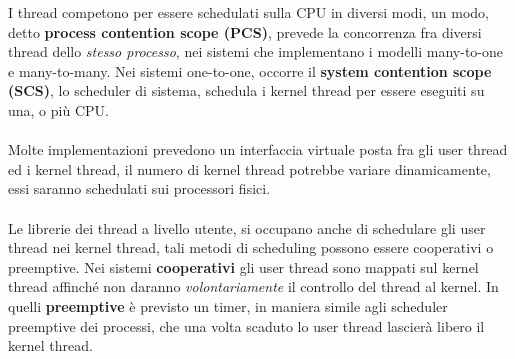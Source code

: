 \documentclass[12pt, letterpaper]{article}
\newcommand{\acc}{\\\hphantom{}\\}
\begin{document}
I thread competono per essere schedulati sulla CPU in diversi modi, un modo, detto \textbf{process contention scope (PCS)}, 
prevede la concorrenza fra diversi thread dello \textit{stesso processo}, nei sistemi che implementano i modelli 
many-to-one e many-to-many. Nei sistemi one-to-one, occorre il \textbf{system contention scope (SCS)}, lo scheduler di sistema, 
schedula i kernel thread per essere eseguiti su una, o più CPU. \acc 
Molte implementazioni prevedono un interfaccia virtuale posta fra gli user thread ed i kernel thread, il numero 
di kernel thread potrebbe variare dinamicamente, essi saranno schedulati sui processori fisici.\acc 
Le librerie dei thread a livello utente, si occupano anche di schedulare gli user thread nei kernel thread, tali metodi di 
scheduling possono essere cooperativi o preemptive. Nei sistemi \textbf{cooperativi} gli user thread sono mappati sul kernel 
thread affinché non daranno \textit{volontariamente} il controllo del thread al kernel. In quelli 
\textbf{preemptive} è previsto un timer, in maniera simile agli scheduler preemptive dei processi, che una volta scaduto 
lo user thread lascierà libero il kernel thread.
\end{document}
